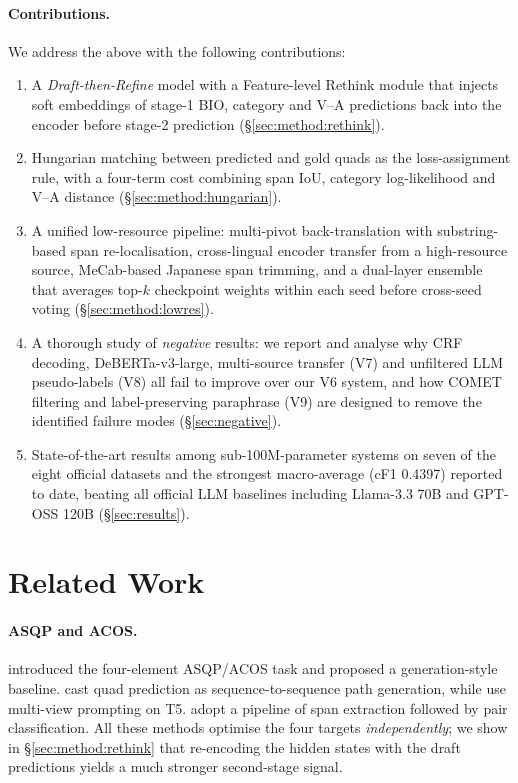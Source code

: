 \documentclass[11pt]{article}
\begin{document}
\paragraph{Contributions.}
We address the above with the following contributions:
\begin{enumerate}[itemsep=2pt,topsep=2pt,leftmargin=*]
  \item A \emph{Draft-then-Refine} model with a Feature-level Rethink
        module that injects soft embeddings of stage-1 BIO,
        category and V--A predictions back into the encoder before
        stage-2 prediction (\S\ref{sec:method:rethink}).
  \item Hungarian matching between predicted and gold quads as the
        loss-assignment rule, with a four-term cost combining span
        IoU, category log-likelihood and V--A distance
        (\S\ref{sec:method:hungarian}).
  \item A unified low-resource pipeline: multi-pivot back-translation
        with substring-based span re-localisation, cross-lingual
        encoder transfer from a high-resource source, MeCab-based
        Japanese span trimming, and a dual-layer ensemble that
        averages top-$k$ checkpoint weights within each seed before
        cross-seed voting (\S\ref{sec:method:lowres}).
  \item A thorough study of \emph{negative} results: we report and
        analyse why CRF decoding, DeBERTa-v3-large, multi-source
        transfer (V7) and unfiltered LLM pseudo-labels (V8) all fail
        to improve over our V6 system, and how COMET filtering and
        label-preserving paraphrase (V9) are designed to remove the
        identified failure modes (\S\ref{sec:negative}).
  \item State-of-the-art results among sub-100M-parameter systems on
        seven of the eight official datasets and the strongest
        macro-average (cF1 0.4397) reported to date, beating all
        official LLM baselines including Llama-3.3 70B and GPT-OSS
        120B (\S\ref{sec:results}).
\end{enumerate}

\section{Related Work}
\label{sec:related}

\paragraph{ASQP and ACOS.}
\citet{cai2021acos} introduced the four-element ASQP/ACOS task and
proposed a generation-style baseline.
\citet{zhang2021seq2path} cast quad prediction as
sequence-to-sequence path generation, while
\citet{mao2022mvp} use multi-view prompting on T5.
\citet{hu2022extractthenpredict} adopt a pipeline of span extraction
followed by pair classification.
All these methods optimise the four targets \emph{independently}; we
show in \S\ref{sec:method:rethink} that re-encoding the hidden states
with the draft predictions yields a much stronger second-stage signal.
\end{document}
